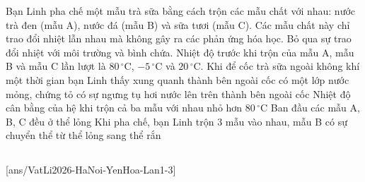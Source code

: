 	\begin{ex}%
		Bạn Linh pha chế một mẫu trà sữa bằng cách trộn các mẫu chất với nhau: nước trà đen (mẫu A), nước đá (mẫu B) và sữa tươi (mẫu C). Các mẫu chất này chỉ trao đổi nhiệt lẫn nhau mà không gây ra các phản ứng hóa học. Bỏ qua sự trao đổi nhiệt với môi trường và bình chứa. Nhiệt độ trước khi trộn của mẫu A, mẫu B và mẫu C lần lượt là $80\,^\circ\text{C}$, $-5\,^\circ\text{C}$ và $20\,^\circ\text{C}$.
		\choiceTFt
		{\True Khi để cốc trà sữa ngoài không khí một thời gian bạn Linh thấy xung quanh thành bên ngoài cốc có một lớp nước mỏng, chứng tỏ có sự ngưng tụ hơi nước lên trên thành bên ngoài cốc}
		{\True Nhiệt độ cân bằng của hệ khi trộn cả ba mẫu với nhau nhỏ hơn $80\,^\circ\text{C}$}
		{Ban đầu các mẫu A, B, C đều ở thể lỏng}
		{Khi pha chế, bạn Linh trộn $3$ mẫu vào nhau, mẫu B có sự chuyển thể từ thể lỏng sang thể rắn}
	\end{ex}

	\subsection*{}
	\setcounter{ex}{0}
	[ans/VatLi2026-HaNoi-YenHoa-Lan1-3]

